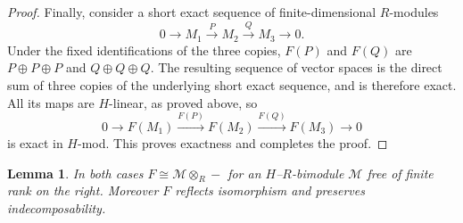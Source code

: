 \documentclass[10pt,oneside]{amsart}
\newtheorem{lemma}[proposition]{Lemma}
\theoremstyle{definition}
\begin{document}
\begin{proof}
Finally, consider a short exact sequence of finite-dimensional
$R$-modules
\[
 0\longrightarrow M_1\xrightarrow{P}M_2
   \xrightarrow{Q}M_3\longrightarrow0.
\]
Under the fixed identifications of the three copies, $F(P)$ and
$F(Q)$ are $P\oplus P\oplus P$ and $Q\oplus Q\oplus Q$.
The resulting sequence of vector spaces is the direct sum of three
copies of the underlying short exact sequence, and is therefore
exact. All its maps are $H$-linear, as proved above, so
\[
 0\longrightarrow F(M_1)\xrightarrow{F(P)}F(M_2)
   \xrightarrow{F(Q)}F(M_3)\longrightarrow0
\]
is exact in $H$-mod. This proves exactness and completes the proof.
\end{proof}

\begin{lemma}\label{lem:wild-bimodule-and-consequences}
In both cases $F\cong\mathcal M\otimes_R-$ for an $H$--$R$-bimodule
$\mathcal M$ free of finite rank on the right. Moreover $F$ reflects
isomorphism and preserves indecomposability.
\end{lemma}
\end{document}
